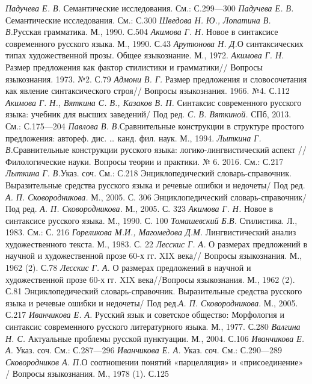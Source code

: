 {\textit{Падучева Е. В.} Семантические исследования. См.: С.299—300}
{\textit{Падучева Е. В. }Семантические исследования. См.: С.300}
{\textit{Шведова Н. Ю., Лопатина В. В.}{Русская грамматика. М., 1990. С.504}}
{\textit{Акимова Г. Н.} Новое в синтаксисе современного русского языка. М., 1990. С.43}
{\textit{Арутюнова Н. Д.}О синтаксических типах художественной прозы. Общее языкознание. М., 1972.}
{\textit{{ Акимова Г. Н. }}{Размер предложения как фактор стилистики и грамматики// Вопросы языкознания. 1973. №2. С.79}}
{\textit{{ Адмони В. Г.}}{ Размер предложения и словосочетания как явление синтаксического строя// Вопросы языкознания. 1966. №4. С.112}}
{\textit{Акимова Г. Н., Вяткина С. В., Казаков В. П. }Синтаксис современного русского языка: учебник для высших заведений/ Под ред. \textit{С. В. Вяткиной.} СПб, 2013. См.: С.175—204}
{\textit{Павлова В. В.}Сравнительные конструкции в структуре простого предложения: автореф. дис. … канд. фил. наук. М., 1994.}
{\textit{Лыткина Г. В.}Сравнительные конструкции русского языка: логико-лингвистический аспект // Филологические науки. Вопросы теории и практики. № 6. 2016. См.: С.217}
{\textit{Лыткина Г. В.}Указ. соч. См.: С.218}
{Энциклопедический словарь-справочник. Выразительные средства русского языка и речевые ошибки и недочеты/ Под ред. \textit{А. П. Сковородникова.} М., 2005. С. 306}
{Энциклопедический словарь-справочник/ Под ред. \textit{А. П. Сковородникова.} М., 2005. С. 323}
{\textit{Акимова Г. Н.} Новое в синтаксисе русского языка. М., 1990. С. 100}
{\textit{Томашевский Б.В.} Стилистика. Л., 1983. См.: С. 216}
{\textit{Гореликова М.И., Магомедова Д.М.} Лингвистический анализ художественного текста. М., 1983. С. 22}
{\textit{{ Лесскис Г. А. }}{О размерах предложений в научной и художественной прозе 60-х гг. XIX века// Вопросы языкознания. М., 1962 (2). С.78}}
{\textit{{ Лесскис Г. А. }}{О размерах предложений в научной и художественной прозе 60-х гг. XIX века//Вопросы языкознания. М., 1962 (2). С.81}}
{Энциклопедический словарь-справочник. Выразительные средства русского языка и речевые ошибки и недочеты/ Под ред.\textit{А. П. Сковородникова}{. М., 2005. С.217}}
{\textit{{ Иванчикова Е. А. }}{Русский язык и советское общество: Морфология и синтаксис современного русского литературного языка. М., 1977.}\textit{{
      }}{С.280}}
{\textit{{ Валгина Н. С. }}{Актуальные проблемы русской пунктуации. М., 2004. С.106}}
{\textit{{Иванчикова Е. А. }}{Указ. соч. См.: С.287—296}}
{\textit{ Иванчикова Е. А. }{Указ. соч. См.: С.290—289}}
{\textit{{ Сковородников А. П.}}{О соотношении понятий «парцелляция» и «присоединение» / Вопросы языкознания. М., 1978 (1). С.125}}
